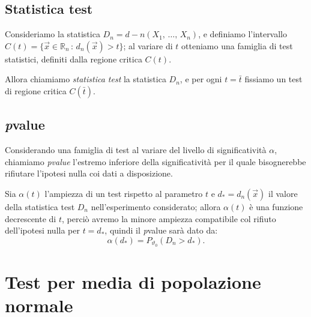         \subsection{Statistica test}
        Consideriamo la statistica $D_n = d-n(X_1,\, \ldots,\, X_{n})$, e definiamo l'intervallo 
        $C(t) = \{\vec{x} \in \mathbb{R}_n \,:\, d_n(\vec{x}) > t\}$; al variare di $t$ otteniamo una famiglia 
        di test statistici, definiti dalla regione critica $C(t)$.

        Allora chiamiamo \emph{statistica test} la statistica $D_n$, e per ogni $t = \bar{t}$ fissiamo 
        un test di regione critica $C(\bar{t})$.
        \subsection{\emph{p}\nbdash value}
            \begin{defn}
                Considerando una famiglia di test al variare del livello di significatività $\alpha$, 
                chiamiamo \emph{p\nbdash value} l'estremo inferiore della significatività per il quale 
                bisognerebbe rifiutare l'ipotesi nulla coi dati a disposizione.
            \end{defn}
            \begin{obsv}
                Sia $\alpha(t)$ l'ampiezza di un test rispetto al parametro $t$ e $d_* = d_n(\vec{x})$ il 
                valore della statistica test $D_n$ nell'esperimento considerato; allora $\alpha(t)$ è 
                una funzione decrescente di $t$, perciò avremo la minore ampiezza compatibile col rifiuto 
                dell'ipotesi nulla per $t = d_*$, quindi il \emph{p}\nbdash value sarà dato da: \[
                    \alpha(d_*) = P_{\vartheta_0}(D_n > d_*)
                .\] 
            \end{obsv}
    \section{Test per media di popolazione normale}
